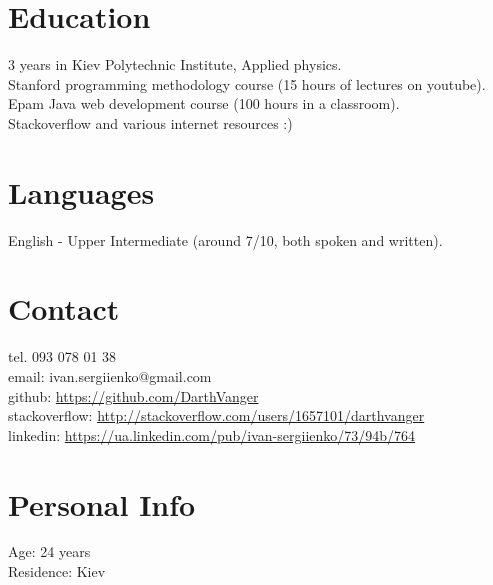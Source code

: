 \documentclass[a4paper, 14pt]{article}
\begin{document}
\section{Education}
	3 years in Kiev Polytechnic Institute, Applied physics. \\
	Stanford programming methodology course (15 hours of lectures on youtube). \\
	Epam Java web development course (100 hours in a classroom). \\
	Stackoverflow and various internet resources :)
\section{Languages}
	English - Upper Intermediate (around 7/10, both spoken and written).
\section{Contact}
	tel. 093 078 01 38 \\
	email: ivan.sergiienko@gmail.com \\
    github: \url{https://github.com/DarthVanger} \\
    stackoverflow: \url{http://stackoverflow.com/users/1657101/darthvanger} \\
    linkedin: \url{https://ua.linkedin.com/pub/ivan-sergiienko/73/94b/764}
\section{Personal Info}
	Age: 24 years \\
	Residence: Kiev
\end{document}
